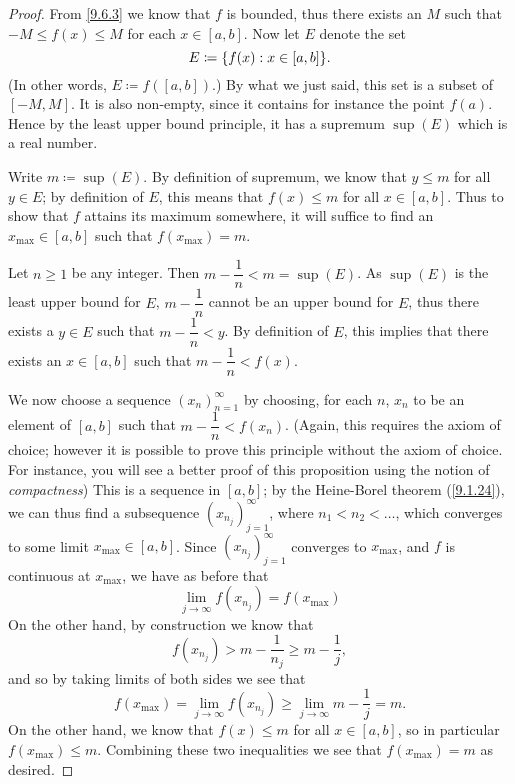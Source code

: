 \begin{proof}
  From \cref{9.6.3} we know that \(f\) is bounded, thus there exists an \(M\) such that \(-M \leq f(x) \leq M\) for each \(x \in [a, b]\).
  Now let \(E\) denote the
  set
  \[
    E \coloneqq \set{f(x) : x \in [a, b]}.
  \]
  (In other words, \(E \coloneqq f([a, b])\).)
  By what we just said, this set is a subset of \([-M, M]\).
  It is also non-empty, since it contains for instance the point \(f(a)\).
  Hence by the least upper bound principle, it has a supremum \(\sup(E)\) which is a real number.

  Write \(m \coloneqq \sup(E)\).
  By definition of supremum, we know that \(y \leq m\) for all \(y \in E\);
  by definition of \(E\), this means that \(f(x) \leq m\) for all \(x \in [a, b]\).
  Thus to show that \(f\) attains its maximum somewhere, it will suffice to find an \(x_{\max} \in [a, b]\) such that \(f(x_{\max}) = m\).

  Let \(n \geq 1\) be any integer.
  Then \(m - \dfrac{1}{n} < m = \sup(E)\).
  As \(\sup(E)\) is the least upper bound for \(E\), \(m - \dfrac{1}{n}\) cannot be an upper bound for \(E\), thus there exists a \(y \in E\) such that \(m - \dfrac{1}{n} < y\).
  By definition of \(E\), this implies that there exists an \(x \in [a, b]\) such that \(m - \dfrac{1}{n} < f(x)\).

  We now choose a sequence \((x_n)_{n = 1}^\infty\) by choosing, for each \(n\), \(x_n\) to be an element of \([a, b]\) such that \(m - \dfrac{1}{n} < f(x_n)\).
  (Again, this requires the axiom of choice;
  however it is possible to prove this principle without the axiom of choice.
  For instance, you will see a better proof of this proposition using the notion of \emph{compactness})
  This is a sequence in \([a, b]\);
  by the Heine-Borel theorem (\cref{9.1.24}), we can thus find a subsequence \((x_{n_j})_{j = 1}^\infty\), where \(n_1 < n_2 < \dots\), which converges to some limit \(x_{\max} \in [a, b]\).
  Since \((x_{n_j})_{j = 1}^\infty\) converges to \(x_{\max}\), and \(f\) is continuous at \(x_{\max}\), we have as before that
  \[
    \lim_{j \to \infty} f(x_{n_j}) = f(x_{\max})
  \]
  On the other hand, by construction we know that
  \[
    f(x_{n_j}) > m - \dfrac{1}{n_j} \geq m - \dfrac{1}{j},
  \]
  and so by taking limits of both sides we see that
  \[
    f(x_{\max}) = \lim_{j \to \infty} f(x_{n_j}) \geq \lim_{j \to \infty} m - \dfrac{1}{j} = m.
  \]
  On the other hand, we know that \(f(x) \leq m\) for all \(x \in [a, b]\), so in particular \(f(x_{\max}) \leq m\).
  Combining these two inequalities we see that \(f(x_{\max}) = m\) as desired.


\end{proof}
